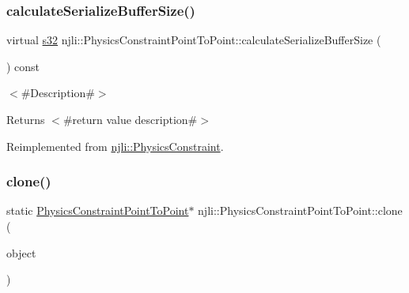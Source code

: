 \mbox{\label{classnjli_1_1_physics_constraint_point_to_point_af0766c0d2de84aa206cd4fcc33b6b9ea}} 
\subsubsection{\texorpdfstring{calculate\+Serialize\+Buffer\+Size()}{calculateSerializeBufferSize()}}
{\footnotesize\ttfamily virtual \mbox{\hyperlink{_util_8h_aa62c75d314a0d1f37f79c4b73b2292e2}{s32}} njli\+::\+Physics\+Constraint\+Point\+To\+Point\+::calculate\+Serialize\+Buffer\+Size (\begin{DoxyParamCaption}{ }\end{DoxyParamCaption}) const\hspace{0.3cm}{\ttfamily [virtual]}}

$<$\#\+Description\#$>$

\begin{DoxyReturn}{Returns}
$<$\#return value description\#$>$ 
\end{DoxyReturn}


Reimplemented from \mbox{\hyperlink{classnjli_1_1_physics_constraint_aeda6c35ab271897cfe3192870d4ac7a4}{njli\+::\+Physics\+Constraint}}.

\mbox{\label{classnjli_1_1_physics_constraint_point_to_point_aa68a1860b305a227593fe00442bb8846}} 
\subsubsection{\texorpdfstring{clone()}{clone()}}
{\footnotesize\ttfamily static \mbox{\hyperlink{classnjli_1_1_physics_constraint_point_to_point}{Physics\+Constraint\+Point\+To\+Point}}$\ast$ njli\+::\+Physics\+Constraint\+Point\+To\+Point\+::clone (\begin{DoxyParamCaption}\item[{const \mbox{\hyperlink{classnjli_1_1_physics_constraint_point_to_point}{Physics\+Constraint\+Point\+To\+Point}} \&}]{object }\end{DoxyParamCaption})\hspace{0.3cm}{\ttfamily [static]}}

